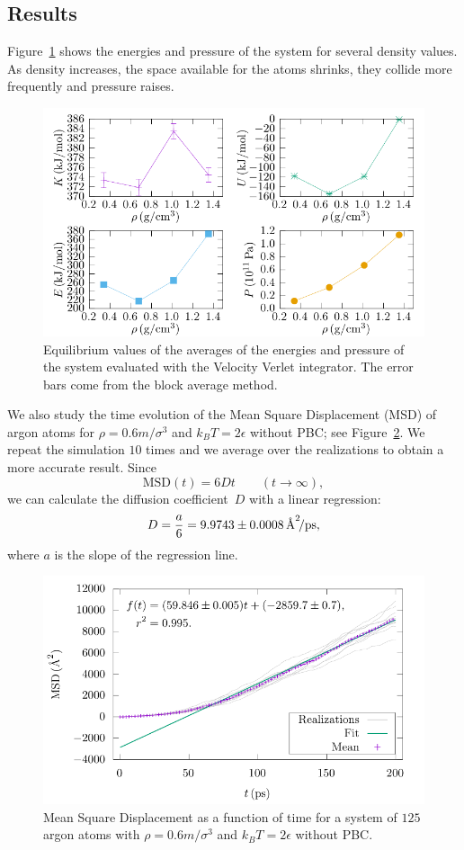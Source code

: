 \documentclass{article}
\begin{document}
  \subsection{Results}

  Figure~\ref{fig:liquid} shows the energies and pressure of the system for several density values. As density increases, the space available for the atoms shrinks, they collide more frequently and pressure raises.
  \begin{figure}[htb]
    \centering
    \includegraphics[width=\linewidth]{../figures/liquid_quantities.pdf}
    \caption{Equilibrium values of the averages of the energies and pressure of the system evaluated with the Velocity Verlet integrator. The error bars come from the block average method.}\label{fig:liquid}
  \end{figure}

  We also study the time evolution of the Mean Square Displacement (MSD) of argon atoms for \(\rho=0.6m/\sigma^{3}\) and \(k_{B}T=2\epsilon\) without PBC; see Figure~\ref{fig:msd}. We repeat the simulation \(10\) times and we average over the realizations to obtain a more accurate result. Since
  \[
    \text{MSD}(t)=6Dt\qquad(t\to\infty),
  \]
  we can calculate the diffusion coefficient~\(D\) with a linear regression:
  \[
    D=\frac{a}{6}=9.9743\pm0.0008\,\textup{\AA}^{2}\!/\mathrm{ps},
  \]
  where \(a\) is the slope of the regression line.
  \begin{figure}[htb]
    \centering
    \includegraphics[width=\linewidth]{../figures/msd.pdf}
    \caption{Mean Square Displacement as a function of time for a system of \(125\) argon atoms with \(\rho=0.6m/\sigma^{3}\) and \(k_{B}T=2\epsilon\) without PBC.}\label{fig:msd}
  \end{figure}
\end{document}
